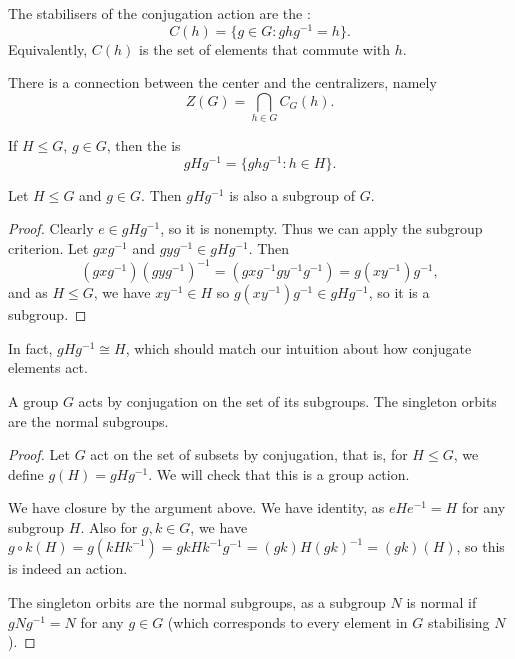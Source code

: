 \begin{definition}[centralizers]
	The stabilisers of the conjugation action are the :
	$$
C(h) = \{ g \in G : ghg^{-1} = h \}.
	$$
	Equivalently, $C(h)$ is the set of elements that commute with $h$.
\end{definition}

There is a connection between the center and the centralizers, namely
$$
Z(G) = \bigcap_{h \in G} C_G(h).
$$

\begin{definition}
	If $H \leq G$, $g \in G$, then the  is
	$$
	gHg^{-1} = \{g hg^{-1} : h \in H\}.
	$$
\end{definition}
\begin{proposition}
	Let $H \leq G$ and $g \in G$. Then $gHg^{-1}$ is also a subgroup of $G$.
\end{proposition}
\begin{proof}[Proof]
	Clearly $e \in gHg^{-1}$, so it is nonempty. Thus we can apply the subgroup criterion. 
	Let $gxg^{-1}$ and $gyg^{-1} \in gHg^{-1}$. Then
	$$
	(gxg^{-1})(gyg^{-1})^{-1} = (gxg^{-1}gy^{-1}g^{-1}) = g(xy^{-1})g^{-1},
	$$
	and as $H \leq G$, we have $xy^{-1} \in H$ so $g(xy^{-1})g^{-1} \in gHg^{-1}$, so it is a subgroup.
\end{proof}
In fact, $gHg^{-1} \cong H$, which should match our intuition about how conjugate elements act.



\begin{proposition}
	A group $G$ acts by conjugation on the set of its subgroups. The singleton orbits are the normal subgroups.
\end{proposition}
\begin{proof}
	Let $G$ act on the set of subsets by conjugation, that is, for $H \leq G$, we define $g(H) = gHg^{-1}$. We will check that this is a group action.
	
	We have closure by the argument above. We have identity, as $eHe^{-1} = H$ for any subgroup $H$. Also for $g, k \in G$, we have $g\circ k (H) = g(k H k^{-1}) = gk H k^{-1}g^{-1} = (gk)H(gk)^{-1} = (gk)(H)$, so this is indeed an action.

	The singleton orbits are the normal subgroups, as a subgroup $N$ is normal if $g N g^{-1} = N$ for any $g \in G$ (which corresponds to every element in $G$ stabilising $N$).
\end{proof}


